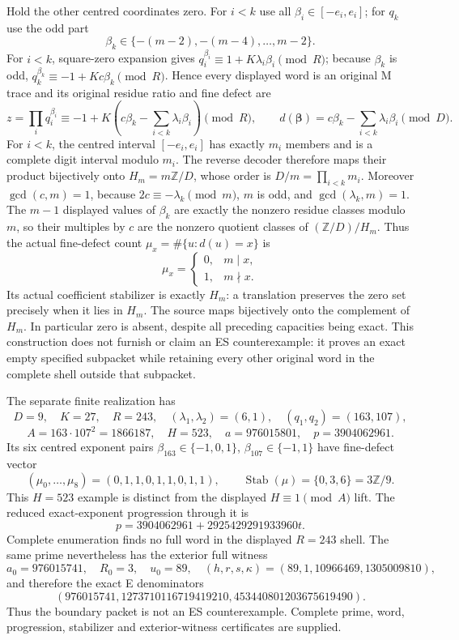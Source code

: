 Hold the other centred coordinates zero. For $i<k$ use all
$\beta_i\in[-e_i,e_i]$; for $q_k$ use the odd part
\[
 \beta_k\in\{-(m-2),-(m-4),\ldots,m-2\}.
\]
For $i<k$, square-zero expansion gives
$q_i^{\beta_i}\equiv1+K\lambda_i\beta_i\pmod R$; because $\beta_k$ is odd,
$q_k^{\beta_k}\equiv-1+Kc\beta_k\pmod R$. Hence every displayed word is an
original M trace and its original residue ratio and fine defect are
\[
 z=\prod_iq_i^{\beta_i}
 \equiv-1+K\left(c\beta_k-\sum_{i<k}\lambda_i\beta_i\right)\pmod R,
 \qquad
 d(\boldsymbol\beta)=c\beta_k-\sum_{i<k}\lambda_i\beta_i\pmod D.
\]
For $i<k$, the centred interval $[-e_i,e_i]$ has exactly $m_i$ members and is
a complete digit interval modulo $m_i$. The reverse decoder therefore maps
their product bijectively onto $H_m=m\mathbb Z/D$, whose order is
$D/m=\prod_{i<k}m_i$. Moreover $\gcd(c,m)=1$, because
$2c\equiv-\lambda_k\pmod m$, $m$ is odd, and $\gcd(\lambda_k,m)=1$. The
$m-1$ displayed values of $\beta_k$ are exactly the nonzero residue classes
modulo $m$, so their multiples by $c$ are the nonzero quotient classes of
$(\mathbb Z/D)/H_m$. Thus the actual fine-defect count
$\mu_x=\#\{u:d(u)=x\}$ is
\begin{equation}\label{eq:sharp}
 \mu_x=\begin{cases}0,&m\mid x,\\1,&m\nmid x.\end{cases}
\end{equation}
Its actual coefficient stabilizer is exactly $H_m$: a translation preserves
the zero set precisely when it lies in $H_m$. The source maps bijectively onto
the complement of $H_m$. In particular zero is absent, despite all preceding
capacities being exact.
This construction does not furnish or claim an ES counterexample: it proves an
exact empty specified subpacket while retaining every other original word in
the complete shell outside that subpacket.

The separate finite realization has
\[
 D=9,\quad K=27,\quad R=243,\quad
 (\lambda_1,\lambda_2)=(6,1),\quad(q_1,q_2)=(163,107),
\]
\[
 A=163\cdot107^2=1866187,\quad H=523,\quad
 a=976015801,\quad p=3904062961.
\]
Its six centred exponent pairs
$\beta_{163}\in\{-1,0,1\}$, $\beta_{107}\in\{-1,1\}$ have fine-defect vector
\[
 (\mu_0,\ldots,\mu_8)=(0,1,1,0,1,1,0,1,1),\qquad
 \operatorname{Stab}(\mu)=\{0,3,6\}=3\mathbb Z/9.
\]
This $H=523$ example is distinct from the displayed $H\equiv1\pmod A$ lift.
The reduced exact-exponent progression through it is
\[
 p=3904062961+2925429291933960t.
\]
Complete enumeration finds no full word in the displayed $R=243$ shell. The
same prime nevertheless has the exterior full witness
\[
 a_0=976015741,\quad R_0=3,\quad u_0=89,\quad
 (h,r,s,\kappa)=(89,1,10966469,1305009810),
\]
and therefore the exact E denominators
\[
 (976015741,1273710116719419210,453440801203675619490).
\]
Thus the boundary packet is not an ES counterexample. Complete prime, word,
progression, stabilizer and exterior-witness certificates are supplied.

